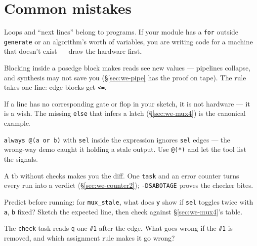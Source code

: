 \section{Common mistakes}\label{sec:cm11}

\begin{tripwire}
Loops and ``next lines'' belong to programs. If your module has a
\texttt{for} outside \texttt{generate} or an algorithm's worth of
variables, you are writing code for a machine that doesn't exist ---
draw the hardware first.
\end{tripwire}
\begin{tripwire}[\texttt{=} where \texttt{<=} belongs]
Blocking inside a posedge block makes reads see new values ---
pipelines collapse, and synthesis may not save you
(\S\ref{sec:we-pipe} has the proof on tape). The rule takes one line:
edge blocks get \texttt{<=}.
\end{tripwire}
\begin{tripwire}
If a line has no corresponding gate or flop in your sketch, it is not
hardware --- it is a wish. The missing \texttt{else} that infers a
latch (\S\ref{sec:we-mux4}) is the canonical example.
\end{tripwire}
\begin{tripwire}
\texttt{always @(a or b)} with \texttt{sel} inside the expression
ignores \texttt{sel} edges --- the wrong-way demo caught it holding a
stale output. Use \texttt{@(*)} and let the tool list the signals.
\end{tripwire}
\begin{tripwire}
A tb without checks makes you the diff. One \texttt{task} and an error
counter turns every run into a verdict
(\S\ref{sec:we-counter2}); \texttt{-DSABOTAGE} proves the checker
bites.
\end{tripwire}

\begin{exercise}[medium]
Predict before running: for \texttt{mux\_stale}, what does \texttt{y}
show if \texttt{sel} toggles twice with \texttt{a}, \texttt{b} fixed?
Sketch the expected line, then check against
\S\ref{sec:we-mux4}'s table.
\end{exercise}

\begin{exercise}[medium]
The \texttt{check} task reads \texttt{q} one \texttt{\#1} after the
edge. What goes wrong if the \texttt{\#1} is removed, and which
assignment rule makes it go wrong?
\end{exercise}


